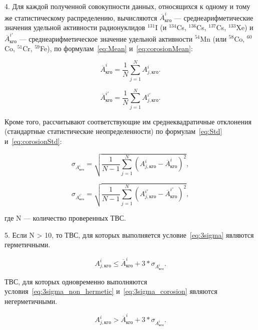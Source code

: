4. Для каждой полученной совокупности данных, относящихся к одному
и тому же статистическому распределению, вычисляются $\overline{A}_{кго}^{i}$ --- среднеарифметические значения удельной активности радионуклидов $^{131}$I (и $^{134}$Cs, $^{136}$Cs, $^{137}$Cs, $^{133}$Xe) и $\overline{A}_{кго}^{i'}$ --- среднеарифметическое значение удельной активности $^{54}$Mn (или $^{58}$Co, $^{60}$Co, $^{51}$Cr, $^{59}$Fe), по формулам~\ref{eq:Mean} и~\ref{eq:corosionMean}:

\begin{equation} \label{eq:Mean}
	\overline{A}_{кго}^{i} = \frac{1}{N}\sum_{j=1}^{N}A_{j,кго}^{i}.
\end{equation}

\begin{equation} \label{eq:corosionMean}
	\overline{A}_{кго}^{i'} = \frac{1}{N}\sum_{j=1}^{N}A_{j,кго}^{i'}.
\end{equation}

Кроме того, рассчитывают соответствующие им среднеквадратичные
отклонения (стандартные статистические неопределенности) по формулам~\ref{eq:Std} и~\ref{eq:corosionStd}:

\begin{equation} \label{eq:Std}
	\sigma_{{A}_{кго}^{i}} = \sqrt{\frac{1}{N-1}\sum_{j=1}^{N}(A_{j,кго}^{i} - \overline{A}_{кго}^{i})^2},
\end{equation}
	
\begin{equation} \label{eq:corosionStd}
	\sigma_{{A}_{кго}^{i'}} = \sqrt{\frac{1}{N-1}\sum_{j=1}^{N}(A_{j,кго}^{i'} - \overline{A}_{кго}^{i'})^2},
\end{equation}

где N --- количество проверенных ТВС.

5. Если N > 10, то ТВС, для которых выполняется условие~\ref{eq:3sigma} являются герметичными.

\begin{equation} \label{eq:3sigma}
	A_{j,кго}^{i} \leq \overline{A}_{кго}^{i} + 3*\sigma_{{A}_{кго}^{i}}.
\end{equation}

ТВС, для которых одновременно выполняются условия~\ref{eq:3sigma_non_hermetic} и~\ref{eq:3sigma_corosion} являются негерметичными.

\begin{equation} \label{eq:3sigma_non_hermetic}
	A_{j,кго}^{i} > \overline{A}_{кго}^{i} + 3*\sigma_{{A}_{кго}^{i}}.
\end{equation}

